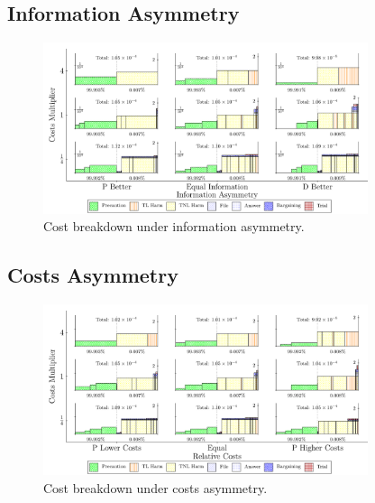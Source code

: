\documentclass{article}
\begin{document}
\FloatBarrier
\subsection{Information Asymmetry}
\begin{figure}[ht]
  \centering
  \includegraphics[width=0.85\textwidth]{../Figures/Cost Breakdown Information Asymmetry (All Rows).pdf}
  \caption{Cost breakdown under information asymmetry.}
  \label{fig:info_asymmetry}
\end{figure}

\FloatBarrier
\subsection{Costs Asymmetry}
\begin{figure}[ht]
  \centering
  \includegraphics[width=0.85\textwidth]{../Figures/Cost Breakdown Relative Costs (All Rows).pdf}
  \caption{Cost breakdown under costs asymmetry.}
  \label{fig:costs_asymmetry}
\end{figure}

\FloatBarrier
\end{document}
